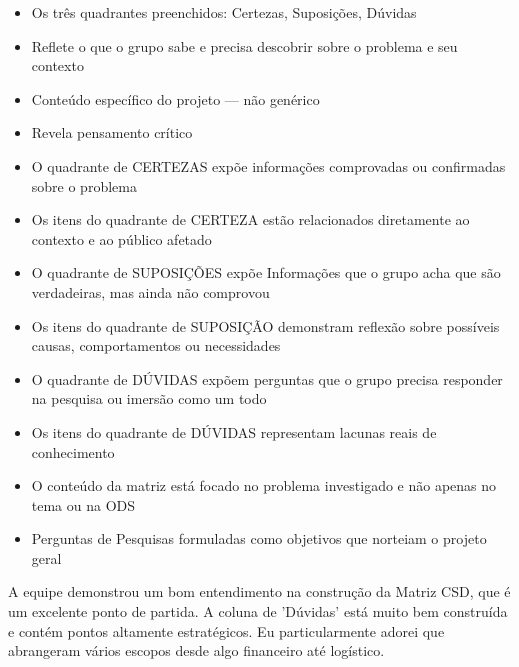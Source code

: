\documentclass[
  sigconf,
  nonacm, %
  language=portuguese
]{acmart}
\begin{document}
\begin{itemize}[leftmargin=14pt,itemsep=1pt,topsep=3pt,parsep=0pt]
  \item[\textcolor{cgood}{$\checkmark$}] {\small\textcolor{cgood}{Os três quadrantes preenchidos: Certezas, Suposições, Dúvidas}}
  \item[\textcolor{cgood}{$\checkmark$}] {\small\textcolor{cgood}{Reflete o que o grupo sabe e precisa descobrir sobre o problema e seu contexto}}
  \item[\textcolor{cgood}{$\checkmark$}] {\small\textcolor{cgood}{Conteúdo específico do projeto — não genérico}}
  \item[\textcolor{cgood}{$\checkmark$}] {\small\textcolor{cgood}{Revela pensamento crítico}}
  \item[\textcolor{cgood}{$\checkmark$}] {\small\textcolor{cgood}{O quadrante de CERTEZAS expõe informações comprovadas ou confirmadas sobre o problema}}
  \item[\textcolor{cgood}{$\checkmark$}] {\small\textcolor{cgood}{Os itens do quadrante de CERTEZA estão relacionados diretamente ao contexto e ao público afetado}}
  \item[\textcolor{cgood}{$\checkmark$}] {\small\textcolor{cgood}{O quadrante de SUPOSIÇÕES expõe Informações que o grupo acha que são verdadeiras, mas ainda não comprovou}}
  \item[\textcolor{cgood}{$\checkmark$}] {\small\textcolor{cgood}{Os itens do quadrante de SUPOSIÇÃO demonstram reflexão sobre possíveis causas, comportamentos ou necessidades}}
  \item[\textcolor{cgood}{$\checkmark$}] {\small\textcolor{cgood}{O quadrante de DÚVIDAS expõem perguntas que o grupo precisa responder na pesquisa ou imersão como um todo}}
  \item[\textcolor{cgood}{$\checkmark$}] {\small\textcolor{cgood}{Os itens do quadrante de DÚVIDAS representam lacunas reais de conhecimento}}
  \item[\textcolor{cgood}{$\checkmark$}] {\small\textcolor{cgood}{O conteúdo da matriz está focado no problema investigado e não apenas no tema ou na ODS}}
  \item[$\square$] {\small\textcolor{cmuted}{Perguntas de Pesquisas formuladas como objetivos que norteiam o projeto geral}}
\end{itemize}

A equipe demonstrou um bom entendimento na construção da Matriz CSD, que é um excelente ponto de partida. A coluna de 'Dúvidas' está muito bem construída e contém pontos altamente estratégicos. Eu particularmente adorei que abrangeram vários escopos desde algo financeiro até logístico.
\end{document}
